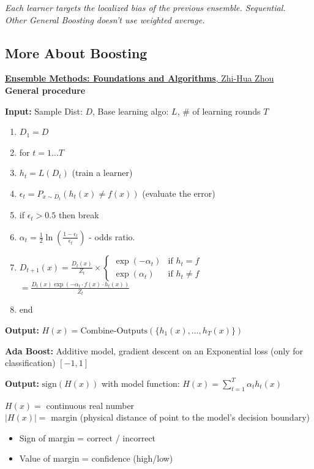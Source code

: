 \documentclass{article}
\begin{document}
\textit{Each learner targets the localized bias of the previous ensemble. Sequential.} \\
\textit{Other General Boosting doesn't use weighted average.}

\subsection*{More About Boosting}
\href{https://doi.org/10.1201/b12207}{\textbf{Ensemble Methods: Foundations and Algorithms}, Zhi-Hua Zhou}\\

\textbf{General procedure}

\textbf{Input:} Sample Dist: $D$, Base learning algo: $L$, \# of learning rounds $T$
\begin{enumerate}
    \item $D_1 = D$
    \item for $t = 1 \dots T$
    \item $h_t = L(D_t)$ (train a learner)
    \item $\epsilon_t = P_{x \sim D_t}(h_t(x) \ne f(x))$ (evaluate the error)
    \item if $\epsilon_t > 0.5$ then break
    \item $\alpha_t = \frac{1}{2} \ln \left( \frac{1 - \epsilon_t}{\epsilon_t} \right)$ - odds ratio.
    \item $D_{t+1}(x) = \frac{D_t(x)}{Z_t} \times \begin{cases} \exp(-\alpha_t) & \text{if } h_t = f \\ \exp(\alpha_t) & \text{if } h_t \ne f \end{cases}$ \\
    $= \frac{D_t(x) \exp(-\alpha_t \cdot f(x) \cdot h_t(x))}{Z_t}$
    \item end
\end{enumerate}

\textbf{Output:} $H(x) = \text{Combine-Outputs}(\{h_1(x), \dots, h_T(x)\})$

\textbf{Ada Boost:} Additive model, gradient descent on an Exponential loss (only for classification) $[-1, 1]$

\textbf{Output:} $\text{sign}(H(x))$ with model function:
$H(x) = \sum_{t=1}^{T} \alpha_t h_t(x)$

$H(x) =$ continuous real number \\
$|H(x)| =$ margin (physical distance of point to the model's decision boundary)
\begin{itemize}
    \item Sign of margin = correct / incorrect
    \item Value of margin = confidence (high/low)
\end{itemize}
\end{document}
